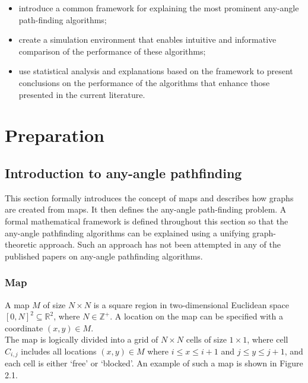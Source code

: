 \documentclass[12pt,notitlepage]{report}
\begin{document}
\begin{itemize}
\item introduce a common framework for explaining the most prominent any-angle path-finding algorithms;
\item create a simulation environment that enables intuitive and informative comparison of the performance of these algorithms;
\item use statistical analysis and explanations based on the framework to present conclusions on the performance of the algorithms that enhance those presented in the current literature.
\end {itemize}

\cleardoublepage


\chapter{Preparation} 

\section{Introduction to any-angle pathfinding}

This section formally introduces the concept of maps and describes how graphs are created from maps. It then defines the any-angle path-finding problem. A formal mathematical framework is defined throughout this section so that the any-angle pathfinding algorithms can be explained using a unifying graph-theoretic approach. Such an approach has not been attempted in any of the published papers on any-angle pathfinding algorithms.

\subsection{Map}

A map $M$ of size $N \times N$ is a square region in two-dimensional Euclidean space $[0,N]^{2} \subseteq \mathbb{R}^{2}$, where $N \in\mathbb{Z^+}$. A location on the map can be specified with a coordinate $(x,y) \in M$.\\

\noindent
The map is logically divided into a grid of $N \times N$ cells of size $1 \times 1$, where cell $C_{i,j}$ includes all locations $(x,y) \in M$ where $i \leq x \leq i+1$ and $j \leq y \leq j+1$, and each cell is either `free' or `blocked'. An example of such a map is shown in Figure 2.1.\\
\end{document}
